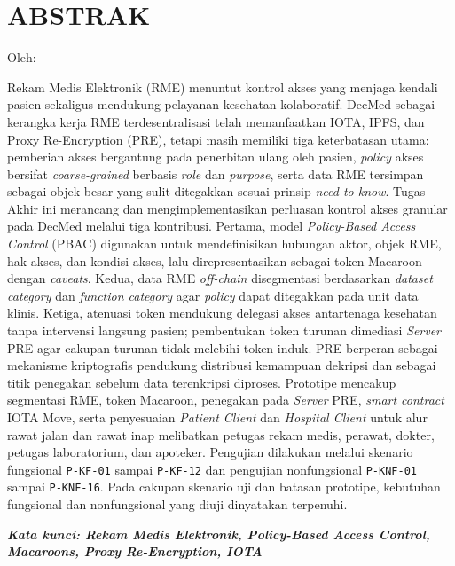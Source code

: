 \documentclass[bahasa, 12pt, a4paper, onecolumn, oneside, final]{report}
\begin{document}
\pagestyle{plain}

\clearpage
\chapter*{ABSTRAK}
\begin{center}
	\center
	\begin{singlespace}
		\large\bfseries\MakeUppercase{\thetitle}

		\normalfont\normalsize
		Oleh:

		\bfseries \theauthor
	\end{singlespace}
\end{center}

\begin{singlespace}
	\small
	Rekam Medis Elektronik (RME) menuntut kontrol akses yang menjaga kendali pasien sekaligus mendukung pelayanan kesehatan kolaboratif. DecMed sebagai kerangka kerja RME terdesentralisasi telah memanfaatkan IOTA, IPFS, dan Proxy Re-Encryption (PRE), tetapi masih memiliki tiga keterbatasan utama: pemberian akses bergantung pada penerbitan ulang oleh pasien, \textit{policy} akses bersifat \textit{coarse-grained} berbasis \textit{role} dan \textit{purpose}, serta data RME tersimpan sebagai objek besar yang sulit ditegakkan sesuai prinsip \textit{need-to-know}. Tugas Akhir ini merancang dan mengimplementasikan perluasan kontrol akses granular pada DecMed melalui tiga kontribusi. Pertama, model \textit{Policy-Based Access Control} (PBAC) digunakan untuk mendefinisikan hubungan aktor, objek RME, hak akses, dan kondisi akses, lalu direpresentasikan sebagai token Macaroon dengan \textit{caveats}. Kedua, data RME \textit{off-chain} disegmentasi berdasarkan \textit{dataset category} dan \textit{function category} agar \textit{policy} dapat ditegakkan pada unit data klinis. Ketiga, atenuasi token mendukung delegasi akses antartenaga kesehatan tanpa intervensi langsung pasien; pembentukan token turunan dimediasi \textit{Server} PRE agar cakupan turunan tidak melebihi token induk. PRE berperan sebagai mekanisme kriptografis pendukung distribusi kemampuan dekripsi dan sebagai titik penegakan sebelum data terenkripsi diproses. Prototipe mencakup segmentasi RME, token Macaroon, penegakan pada \textit{Server} PRE, \textit{smart contract} IOTA Move, serta penyesuaian \textit{Patient Client} dan \textit{Hospital Client} untuk alur rawat jalan dan rawat inap melibatkan petugas rekam medis, perawat, dokter, petugas laboratorium, dan apoteker. Pengujian dilakukan melalui skenario fungsional \texttt{P-KF-01} sampai \texttt{P-KF-12} dan pengujian nonfungsional \texttt{P-KNF-01} sampai \texttt{P-KNF-16}. Pada cakupan skenario uji dan batasan prototipe, kebutuhan fungsional dan nonfungsional yang diuji dinyatakan terpenuhi.

	\textbf{\textit{Kata kunci: Rekam Medis Elektronik, Policy-Based Access Control, Macaroons, Proxy Re-Encryption, IOTA}}

\end{singlespace}
\clearpage
\end{document}
